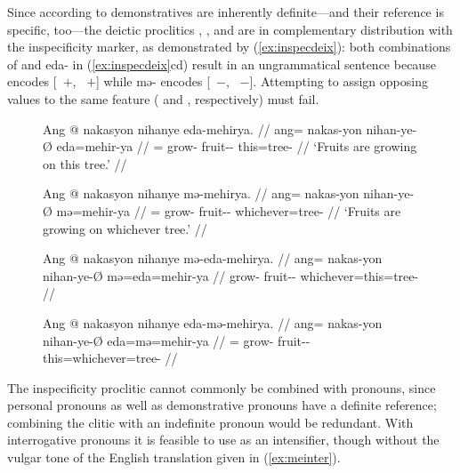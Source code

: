 Since according to \citet[152]{lyons1999} demonstratives are inherently
definite---and their reference is specific, too---the deictic proclitics
, , and  are in
complementary distribution with the inspecificity marker, as demonstrated by
(\ref{ex:inspecdeix}): both combinations of  and 
{eda-} in (\ref{ex:inspecdeix}cd) result in an ungrammatical sentence because 
 encodes [\Def{}~$+$, \Specif{}~$+$] while 
{mə-} encodes [\Def{}~$-$, \Specif{}~$-$]. Attempting to assign
opposing values to the same feature (\Def{} and \Specif{},
respectively) must fail.

\begin{figure}
\pex\label{ex:inspecdeix}
\a\label{ex:inspecdeix_1}\begingl
	\gla Ang @ nakasyon nihanye eda-mehirya. //
	\glb ang= nakas-yon nihan-ye-Ø eda=mehir-ya //
	\glc \AgtT{}= grow-\TplN{} fruit-\Pl{}-\Top{} this=tree-\Loc{} //
	\glft `Fruits are growing on this tree.' //
\endgl

\a\label{ex:inspecdeix_2}\begingl
	\gla Ang @ nakasyon nihanye mə-mehirya. //
	\glb ang= nakas-yon nihan-ye-Ø mə=mehir-ya //
	\glc \AgtT{}= grow-\TplN{} fruit-\Pl{}-\Top{} whichever=tree-\Loc{} //
	\glft `Fruits are growing on whichever tree.' //
\endgl

\a\ljudge*\label{ex:inspecdeix_3}\begingl
	\gla Ang @ nakasyon nihanye mə-eda-mehirya. //
	\glb ang= nakas-yon nihan-ye-Ø mə=eda=mehir-ya //
	\glc \AgtT{} grow-\TplN{} fruit-\Pl{}-\Top{} whichever=this=tree-\Loc{} //
\endgl

\a\ljudge*\label{ex:inspecdeix_4}\begingl
	\gla Ang @ nakasyon nihanye eda-mə-mehirya. //
	\glb ang= nakas-yon nihan-ye-Ø eda=mə=mehir-ya //
	\glc \AgtT{}= grow-\TplN{} fruit-\Pl{}-\Top{} this=whichever=tree-\Loc{} //
\endgl

\xe
\end{figure}

The inspecificity proclitic  cannot commonly be combined with
pronouns, since personal pronouns as well as demonstrative pronouns have a
definite reference; combining the clitic with an indefinite pronoun would be
redundant. With interrogative pronouns it is feasible to use  as
an intensifier, though without the vulgar tone of the English translation given
in (\ref{ex:meinter}).

